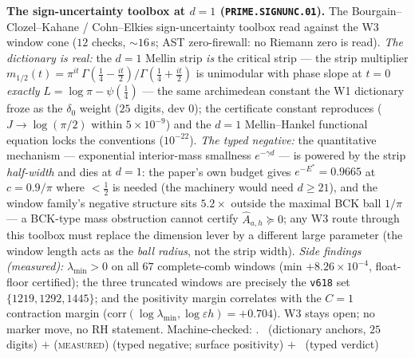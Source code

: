 \par\smallskip\noindent\textbf{The sign-uncertainty toolbox at $d=1$
(\texttt{PRIME.SIGNUNC.01}).}
The Bourgain--Clozel--Kahane / Cohn--Elkies sign-uncertainty toolbox
read against the W3 window cone ($12$ checks, ${\sim}16$\,s; AST
zero-firewall: no Riemann zero is read).  \emph{The dictionary is
real:} the $d=1$ Mellin strip \emph{is} the critical strip --- the
strip multiplier
$m_{1/2}(t)=\pi^{it}\,\Gamma(\tfrac14-\tfrac{it}2)/\Gamma(\tfrac14+\tfrac{it}2)$
is unimodular with phase slope at $t=0$ \emph{exactly}
$L=\log\pi-\psi(\tfrac14)$ --- the same archimedean constant the W1
dictionary froze as the $\delta_0$ weight ($25$ digits, dev $0$); the
certificate constant reproduces ($J\to\log(\pi/2)$ within
$5\times10^{-9}$) and the $d=1$ Mellin--Hankel functional equation
locks the conventions ($10^{-22}$).  \emph{The typed negative:} the
quantitative mechanism --- exponential interior-mass smallness
$e^{-\gamma d}$ --- is powered by the strip \emph{half-width} and dies
at $d=1$: the paper's own budget gives $e^{-E^*}=0.9665$ at
$c=0.9/\pi$ where $<\tfrac12$ is needed (the machinery would need
$d\ge21$), and the window family's negative structure sits
$5.2\times$ outside the maximal BCK ball $1/\pi$ --- a BCK-type mass
obstruction cannot certify $\widehat A_{a,h}\succeq0$; any W3 route
through this toolbox must replace the dimension lever by a different
large parameter (the window length acts as the \emph{ball radius},
not the strip width).  \emph{Side findings (measured):}
$\lambda_{\min}>0$ on all $67$ complete-comb windows (min
$+8.26\times10^{-4}$, float-floor certified); the three truncated
windows are precisely the \texttt{v618} set $\{1219,1292,1445\}$; and
the positivity margin correlates with the $C=1$ contraction margin
($\mathrm{corr}(\log\lambda_{\min},\log\varepsilon h)=+0.704$).  W3
stays open; no marker move, no RH statement.
Machine-checked: .
\mE\ (dictionary anchors, $25$ digits) $+$ (\textsc{measured}) (typed
negative; surface positivity) $+$ \mC\ (typed verdict)
\par\smallskip


